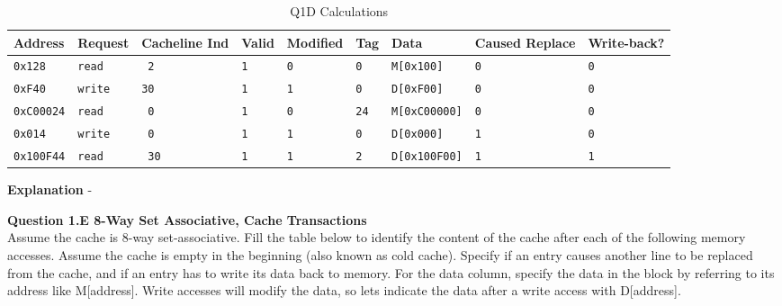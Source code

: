\documentclass[a4paper,11pt]{article}
\newcommand{\T}{\texttt}
\begin{document}
\begin{table}[H]
\caption{Q1D Calculations} \label{tab:q1calc} 
\begin{center}
\begin{tabular}{| l | l | l | l | l | l | l | l | l |}
\hline
Address       & Request    & Cacheline Ind & Valid  & Modified  & Tag    & Data            & Caused Replace  & Write-back?    \\ \hline
\T{0x128}     &  \T{read}  & \T{ 2 }       & \T{1}  & \T{0}     & \T{0}  & \T{M[0x100]}    &      \T{0}      & \T{0}    \\ \hline
\T{0xF40}     &  \T{write} & \T{30 }       & \T{1}  & \T{1}     & \T{0}  & \T{D[0xF00]}    &      \T{0}      & \T{0}    \\ \hline
\T{0xC00024}  &  \T{read}  & \T{ 0 }       & \T{1}  & \T{0}     & \T{24} & \T{M[0xC00000]} &      \T{0}      & \T{0}    \\ \hline
\T{0x014}     &  \T{write} & \T{ 0 }       & \T{1}  & \T{1}     & \T{0}  & \T{D[0x000]}    &      \T{1}      & \T{0}    \\ \hline
\T{0x100F44}  &  \T{read}  & \T{ 30}       & \T{1}  & \T{1}     & \T{2}  & \T{D[0x100F00]} &      \T{1}      & \T{1}    \\ \hline
\end{tabular}
\end{center}
\end{table}

\textbf{Explanation} - 


\item \textbf{Question 1.E 8-Way Set Associative, Cache Transactions } \\
Assume the cache is 8-way set-associative. Fill the table below to identify the content of the cache after each of the following memory accesses. Assume the cache is empty in the beginning (also known as cold cache). Specify if an entry causes another line to be replaced from the cache, and if an entry has to write its data back to memory. For the data column, specify the data in the block by referring to its address like M[address]. Write accesses will modify the data, so lets indicate the data after a write access with D[address].
\end{document}
